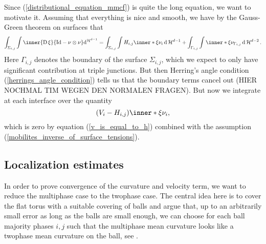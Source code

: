 	Since (\ref{distributional_equation_mmcf}) is quite the long equation, we want to motivate it. Assuming that everything is nice and smooth, we have by the Gauss-Green theorem on surfaces \cite[Thm.~11.8]{maggi_sets_of_finite_perimeter} that
	\begin{equation*}
		\int_{ \Sigma_{ i , j } }
			\int 
				\inner{ \diff \xi }{ \mathrm{Id} - \nu \otimes \nu }
			\dd^{\hm^{ d- 1 }}
		=
		\int_{ \Sigma_{ i , j } }
			\int
				H_{ i , j } \inner*{ \xi }{ \nu_{ i } }
			\dd{\hm^{ d- 1 }}
		+
		\int_{ \Gamma_{ i , j } }
			\int
				\inner*{ \xi }{ \nu_{ \Gamma_{ i , j } } }
			\dd{ \hm^{ d - 2 } }.
	\end{equation*}
	Here $ \Gamma_{ i , j } $ denotes the boundary of the surface $ \Sigma_{ i , j } $, which we expect to only have significant contribution at triple junctions. But then Herring's angle condition (\ref{herrings_angle_condition}) tells us that the boundary terms cancel out (HIER NOCHMAL TIM WEGEN DEN NORMALEN FRAGEN). But now we integrate at each interface over the quantity
	\begin{equation*}
		(V_{ i } - H_{ i , j } ) \inner*{ \xi }{ \nu_{ i } },
	\end{equation*}
	which is zero by equation (\ref{v_is_equal_to_h}) combined with the assumption (\ref{mobilites_inverse_of_surface_tensions}).
	
\subsection{Localization estimates}
\label{section_localization_estimates}
In order to prove convergence of the curvature and velocity term, we want to reduce the multiphase case to the twophase case. The central idea here is to cover the flat torus with a suitable covering of balls and argue that, up to an arbitrarily small error as long as the balls are small enough, we can choose for each ball majority phases $ i, j $ such that the multiphase mean curvature looks like a twophase mean curvature on the ball, see .

